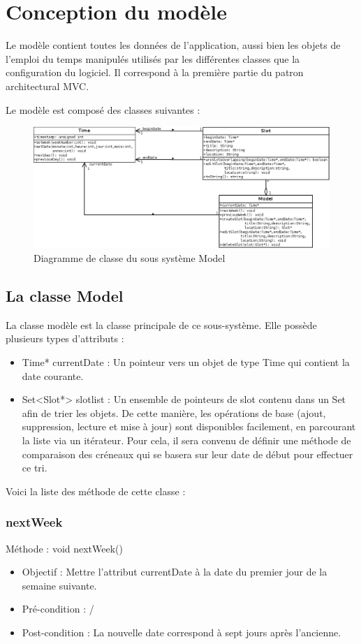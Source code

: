 \chapter{Conception du modèle}
	
	Le modèle contient toutes les données de l'application, aussi bien les objets de l'emploi du temps manipulés utilisés par les différentes classes que la configuration du logiciel. Il correspond à la première partie du patron architectural MVC. 
	
	Le modèle est composé des classes suivantes :
	\begin{figure}
		\centering
		\includegraphics[scale=0.45]{diagclasses_model.png}
		\caption{Diagramme de classe du sous système Model}
	\end{figure}
	\FloatBarrier
	
	\section{La classe Model}
	La classe modèle est la classe principale de ce sous-système. Elle possède plusieurs types d'attributs :
	\begin{itemize}
		\item Time* currentDate : Un pointeur vers un objet de type Time qui contient la date courante.
        \item Set<Slot*> slotlist : Un ensemble de pointeurs de slot contenu dans un Set afin de trier les objets. De cette manière, les opérations de base (ajout, suppression, lecture et mise à jour) sont disponibles facilement, en parcourant la liste via un itérateur. Pour cela, il sera convenu de définir une méthode de comparaison des créneaux qui se basera sur leur date de début pour effectuer ce tri.
	\end{itemize}
	
	Voici la liste des méthode de cette classe :
		\subsection*{nextWeek}
            Méthode : void nextWeek()
			\begin{itemize}
				\item Objectif  : Mettre l'attribut currentDate à la date du premier jour de la semaine suivante.
				\item Pré-condition : /
				\item Post-condition : La nouvelle date correspond à sept jours après l'ancienne.
			\end{itemize}
			
